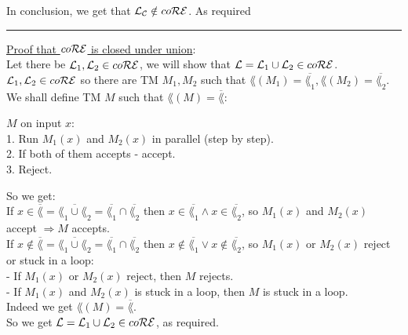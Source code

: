 In conclusion, we get that $\mathcal{L}_{\mathcal{C}} \notin co\mathcal{R}\mathcal{E}$. As required

\begin{center}
    \noindent\rule{4cm}{0.4pt}
\end{center}
\underline{Proof that $co\mathcal{R}\mathcal{E}$ is closed under union}: \\

Let there be $\mathcal{L}_1, \mathcal{L}_2 \in co\mathcal{R}\mathcal{E}$, we will show that $\mathcal{L} = \mathcal{L}_1 \cup \mathcal{L}_2 \in co\mathcal{R}\mathcal{E}$. \\
$\mathcal{L}_1, \mathcal{L}_2 \in co\mathcal{R}\mathcal{E}$ so there are TM $M_1, M_2$ such that
$\lang(M_1) = \overline{\lang_1}, \lang(M_2) = \overline{\lang_2}$. \\
We shall define TM $M$ such that $\lang(M) = \overline{\lang}$:

$M$ on input $x$: \\
1. Run $M_1(x)$ and $M_2(x)$ in parallel (step by step). \\
2. If both of them accepts - accept. \\
3. Reject.

So we get: \\
If $x \in \overline{\lang} = \overline{\lang_1 \cup \lang_2} = \overline{\lang_1} \cap \overline{\lang_2}$ then
$x \in \overline{\lang_1} \wedge x \in \overline{\lang_2}$, so $M_1(x)$ and $M_2(x)$ accept $\Rightarrow M$ accepts. \\
If $x \notin \overline{\lang} = \overline{\lang_1 \cup \lang_2} = \overline{\lang_1} \cap \overline{\lang_2}$  then
$x \notin \overline{\lang_1} \vee x \notin \overline{\lang_2}$, so $M_1(x)$ or $M_2(x)$ reject or stuck in a loop: \\
- If $M_1(x)$ or $M_2(x)$ reject, then $M$ rejects. \\
- If $M_1(x)$ and $M_2(x)$ is stuck in a loop, then $M$ is stuck in a loop. \\

Indeed we get $\lang(M) = \overline{\lang}$. \\
So we get $\mathcal{L} = \mathcal{L}_1 \cup \mathcal{L}_2 \in co\mathcal{R}\mathcal{E}$, as required. \\

